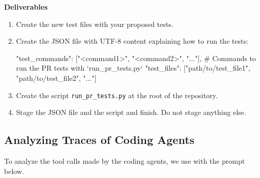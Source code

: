 \begin{promptbox}
\medskip
\textbf{Deliverables}
\begin{enumerate}[leftmargin=1.6em, itemsep=0.35em]
  \item Create the new test files with your proposed tests.
  \item Create the JSON file  with UTF-8 content explaining how to run the tests:
  \begin{schemabox}
{
  "test_commands": ["<command1>", "<command2>", "..."],  # Commands to run the PR tests with `run_pr_tests.py`
  "test_files": ["path/to/test_file1", "path/to/test_file2", "..."]
}
  \end{schemabox}
  \item Create the script \texttt{run\_pr\_tests.py} at the root of the repository.
  \item Stage the JSON file and the script and finish. Do not stage anything else.
\end{enumerate}
\end{promptbox}

\subsection{Analyzing Traces of Coding Agents}
\label{app:prompts:trace_analysis}

To analyze the tool calls made by the coding agents, we use \gptoss with the prompt below.

